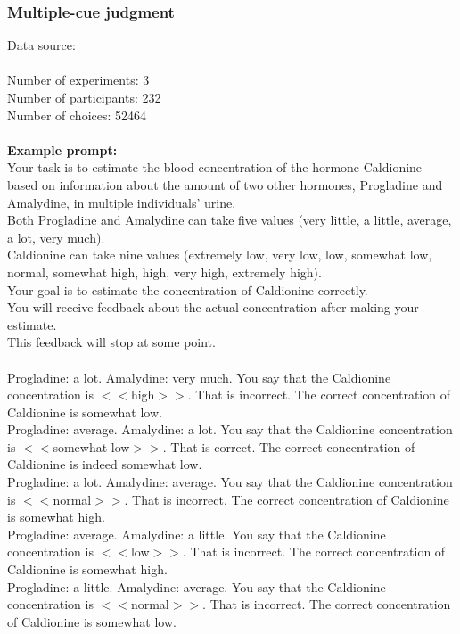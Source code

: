 \documentclass[pdflatex,sn-nature]{sn-jnl}%
\theoremstyle{thmstyleone}%
\theoremstyle{thmstyletwo}%
\theoremstyle{thmstylethree}%
\begin{document}
\subsubsection*{Multiple-cue judgment}
Data source: \cite{collsioo2023numerical} \\ $~$ \\
Number of experiments: 3 $~$\\ 
Number of participants: 232 $~$\\ 
Number of choices: 52464 $~$\\ 
 $~$\\ 
\textbf{Example prompt:}
 $~$\\ 
Your task is to estimate the blood concentration of the hormone Caldionine based on information about the amount of two other hormones, Progladine and Amalydine, in multiple individuals' urine. $~$\\ 
Both Progladine and Amalydine can take five values (very little, a little, average, a lot, very much). $~$\\ 
Caldionine can take nine values (extremely low, very low, low, somewhat low, normal, somewhat high, high, very high, extremely high). $~$\\ 
Your goal is to estimate the concentration of Caldionine correctly. $~$\\ 
You will receive feedback about the actual concentration after making your estimate. $~$\\ 
This feedback will stop at some point. $~$\\ 
 $~$\\ 
Progladine: a lot. Amalydine: very much. You say that the Caldionine concentration is $<<$high$>>$. That is incorrect. The correct concentration of Caldionine is somewhat low. $~$\\ 
Progladine: average. Amalydine: a lot. You say that the Caldionine concentration is $<<$somewhat low$>>$. That is correct. The correct concentration of Caldionine is indeed somewhat low. $~$\\ 
Progladine: a lot. Amalydine: average. You say that the Caldionine concentration is $<<$normal$>>$. That is incorrect. The correct concentration of Caldionine is somewhat high. $~$\\ 
Progladine: average. Amalydine: a little. You say that the Caldionine concentration is $<<$low$>>$. That is incorrect. The correct concentration of Caldionine is somewhat high. $~$\\ 
Progladine: a little. Amalydine: average. You say that the Caldionine concentration is $<<$normal$>>$. That is incorrect. The correct concentration of Caldionine is somewhat low. $~$\\ 
\end{document}

